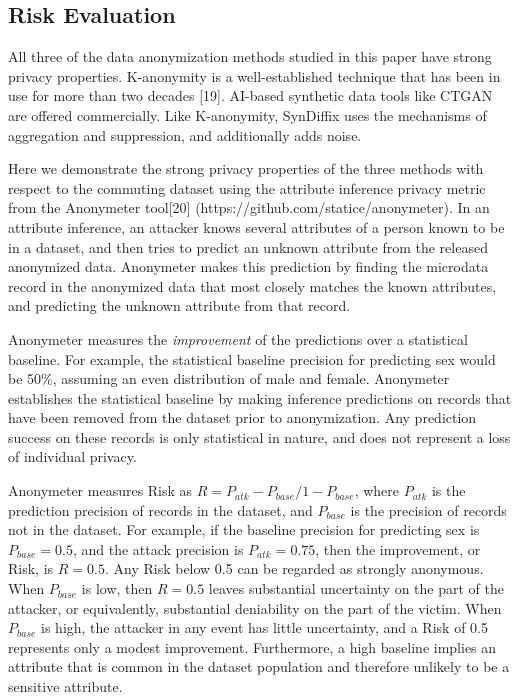 \documentclass[10pt]{article}
\newcommand{\mycite}[1]{[#1]}
\newcommand{\hlmay}[1]{#1}
\begin{document}
\subsection*{\hlmay{Risk Evaluation}}

\hlmay{All three of the data anonymization methods studied in this paper have strong privacy properties. K-anonymity is a well-established technique that has been in use for more than two decades} \mycite{19}. \hlmay{AI-based synthetic data tools like CTGAN are offered commercially. Like K-anonymity, SynDiffix uses the mechanisms of aggregation and suppression, and additionally adds noise.}

\hlmay{Here we demonstrate the strong privacy properties of the three methods with respect to the commuting dataset using the attribute inference privacy metric from the Anonymeter tool}\mycite{20} (https://github.com/statice/anonymeter). \hlmay{In an attribute inference, an attacker knows several attributes of a person known to be in a dataset, and then tries to predict an unknown attribute from the released anonymized data. Anonymeter makes this prediction by finding the microdata record in the anonymized data that most closely matches the known attributes, and predicting the unknown attribute from that record.} 

\hlmay{Anonymeter measures the \textit{improvement} of the predictions over a statistical baseline. For example, the statistical baseline precision for predicting sex would be 50\%, assuming an even distribution of male and female. Anonymeter establishes the statistical baseline by making inference predictions on records that have been removed from the dataset prior to anonymization. Any prediction success on these records is only statistical in nature, and does not represent a loss of individual privacy.
}

\hlmay{Anonymeter measures Risk as $R=P_{atk}-P_{base}/1-P_{base}$, where $P_{atk}$ is the prediction precision of records in the dataset, and $P_{base}$ is the precision of records not in the dataset. For example, if the baseline precision for predicting sex is $P_{base}=0.5$, and the attack precision is $P_{atk}=0.75$, then the improvement, or Risk, is $R=0.5$. Any Risk below 0.5 can be regarded as strongly anonymous. When $P_{base}$ is low, then $R=0.5$ leaves substantial uncertainty on the part of the attacker, or equivalently, substantial deniability on the part of the victim. When $P_{base}$ is high, the attacker in any event has little uncertainty, and a Risk of 0.5 represents only a modest improvement. Furthermore, a high baseline implies an attribute that is common in the dataset population and therefore unlikely to be a sensitive attribute.}
\end{document}
